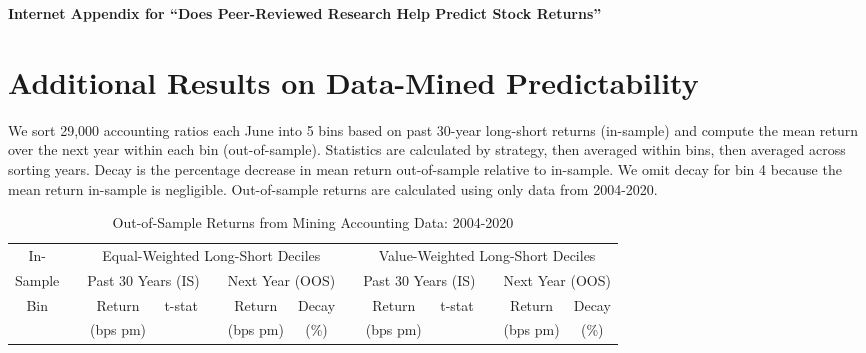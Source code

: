 
\begin{center}
\Large{\textbf{Internet Appendix for ``Does Peer-Reviewed Research Help Predict Stock Returns''}}
\end{center}

\section{Additional Results on Data-Mined Predictability}\label{sec:ia-dm}
\begin{table}[!h]
  \caption{Out-of-Sample Returns from Mining Accounting Data: 2004-2020}
  \label{tab:dm-sum-2004}
  
  \begin{singlespace}
  \noindent 
  We sort 29,000 accounting ratios each June into 5 bins based on past 30-year long-short returns (in-sample) and compute the mean return over the next year within each bin (out-of-sample). Statistics are calculated by strategy, then averaged within bins, then averaged across sorting years. Decay is the percentage decrease in mean return out-of-sample relative to in-sample. We omit decay for bin 4 because the mean return in-sample is negligible. Out-of-sample returns are calculated using only data from 2004-2020.
  \end{singlespace}
  \begin{centering}
  \vspace{-3ex}
  \par\end{centering}
  \centering{}\setlength{\tabcolsep}{1.0ex} \small
  \begin{center}
  \begin{tabular}{crrrrrrrrrrrr} \toprule 
  In- &   & \multicolumn{5}{c}{Equal-Weighted Long-Short Deciles} &   & \multicolumn{5}{c}{Value-Weighted Long-Short Deciles} \\ \cmidrule{3-7}\cmidrule{9-13}Sample &   & \multicolumn{2}{c}{Past 30 Years (IS)} &   & \multicolumn{2}{c}{Next Year (OOS)} &   & \multicolumn{2}{c}{Past 30 Years (IS)} &   & \multicolumn{2}{c}{Next Year (OOS)} \\ \cmidrule{3-4}\cmidrule{6-7}\cmidrule{9-10}\cmidrule{12-13}Bin &   & \multicolumn{1}{c}{Return} & \multicolumn{1}{c}{\multirow{2}[2]{*}{t-stat}} &   & \multicolumn{1}{c}{Return} & \multicolumn{1}{c}{Decay} &   & \multicolumn{1}{c}{Return} & \multicolumn{1}{c}{\multirow{2}[2]{*}{t-stat}} &   & \multicolumn{1}{c}{Return} & \multicolumn{1}{c}{Decay} \\   &   & \multicolumn{1}{c}{(bps pm)} &   &   & \multicolumn{1}{c}{(bps pm)} & \multicolumn{1}{c}{(\%)} &   & \multicolumn{1}{c}{(bps pm)} &   &   & \multicolumn{1}{c}{(bps pm)} & \multicolumn{1}{c}{(\%)} \\ \cmidrule{1-1}\cmidrule{3-4}\cmidrule{6-7}\cmidrule{9-10}\cmidrule{12-13}
  

\end{tabular}
\end{center}
\end{table}
